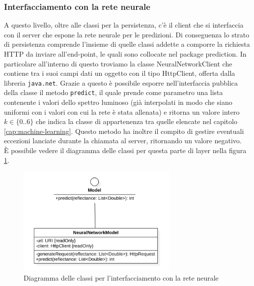 \subsubsection{Interfacciamento con la rete neurale}
A questo livello, oltre alle classi per la persistenza, c'è il client che si interfaccia con il server che espone la rete neurale per le predizioni. Di conseguenza lo strato di persistenza comprende l'insieme di quelle classi addette a comporre la richiesta HTTP da inviare all'end-point, le quali sono collocate nel package prediction. In particolare all'interno di questo troviamo la classe NeuralNetworkClient che contiene tra i suoi campi dati un oggetto con il tipo HttpClient, offerta dalla libreria \verb|java.net|. Grazie a questo è possibile esporre nell'interfaccia pubblica della classe il metodo \verb|predict|, il quale prende come parametro una lista contenente i valori dello spettro luminoso (già interpolati in modo che siano uniformi con i valori con cui la rete è stata allenata) e ritorna un valore intero $k \in \{0 .. 6 \}$ che indica la classe di appartenenza tra quelle elencate nel capitolo \ref{cap:machine-learning}. Questo metodo ha inoltre il compito di gestire eventuali eccezioni lanciate durante la chiamata al server, ritornando un valore negativo.\\
È possibile vedere il diagramma delle classi per questa parte di layer nella figura \ref{fig:class_diagram_neural_network}.

\begin{figure}
    \centering
    \includegraphics[width=0.7\textwidth]{immagini/model_classes.png}
    \caption{Diagramma delle classi per l'interfacciamento con la rete neurale}
    \label{fig:class_diagram_neural_network}
\end{figure}

